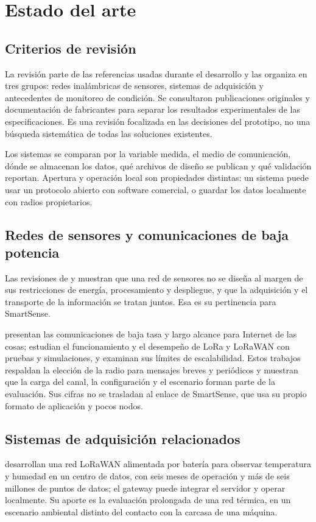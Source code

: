 \chapter{Estado del arte}
\label{cap:estado-arte}

\section{Criterios de revisión}
La revisión parte de las referencias usadas durante el desarrollo y las organiza en tres grupos: redes inalámbricas de sensores, sistemas de adquisición y antecedentes de monitoreo de condición. Se consultaron publicaciones originales y documentación de fabricantes para separar los resultados experimentales de las especificaciones. Es una revisión focalizada en las decisiones del prototipo, no una búsqueda sistemática de todas las soluciones existentes.

Los sistemas se comparan por la variable medida, el medio de comunicación, dónde se almacenan los datos, qué archivos de diseño se publican y qué validación reportan. Apertura y operación local son propiedades distintas: un sistema puede usar un protocolo abierto con software comercial, o guardar los datos localmente con radios propietarios.

\section{Redes de sensores y comunicaciones de baja potencia}
Las revisiones de \citet{akyildiz2002} y \citet{yick2008} muestran que una red de sensores no se diseña al margen de sus restricciones de energía, procesamiento y despliegue, y que la adquisición y el transporte de la información se tratan juntos. Esa es su pertinencia para SmartSense.

\citet{centenaro2016} presentan las comunicaciones de baja tasa y largo alcance para Internet de las cosas; \citet{augustin2016} estudian el funcionamiento y el desempeño de LoRa y LoRaWAN con pruebas y simulaciones, y \citet{bor2016} examinan sus límites de escalabilidad. Estos trabajos respaldan la elección de la radio para mensajes breves y periódicos y muestran que la carga del canal, la configuración y el escenario forman parte de la evaluación. Sus cifras no se trasladan al enlace de SmartSense, que usa su propio formato de aplicación y pocos nodos.

\section{Sistemas de adquisición relacionados}
\citet{polonelli2019} desarrollan una red LoRaWAN alimentada por batería para observar temperatura y humedad en un centro de datos, con seis meses de operación y más de seis millones de puntos de datos; el gateway puede integrar el servidor y operar localmente. Su aporte es la evaluación prolongada de una red térmica, en un escenario ambiental distinto del contacto con la carcasa de una máquina.

